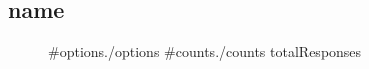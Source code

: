 \subsection{ {{{name}}} }
\begin{figure}[H]
    \barchart
        { {{#options}}{{{.}}}{{/options}} }
        { {{#counts}}{{.}}{{/counts}} }
        { {{totalResponses}} }
\end{figure}
\tagstructend